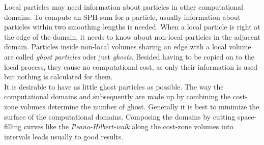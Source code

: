 Local particles may need information about particles in other computational domains. To compute an SPH-sum for a particle, usually information about particles within two smoothing lengths is needed. When a local particle is right at the edge of the domain, it needs to know about non-local particles in the adjacent domain. Particles inside non-local volumes sharing an edge with a local volume are called \emph{ghost particles} oder just \emph{ghosts}. Besided having to be copied on to the local process, they cause no computational cost, as only their information is used but nothing is calculated for them.\\

It is desirable to have as little ghost particles as possible. The way the computational domains and subsequently are made up by combining the cost-zone volumes determine the number of ghost. Generally it is best to minimize the surface of the computational domains. Composing the domains by cutting space-filling curves like the \emph{Peano-Hilbert-walk} along the cost-zone volumes into intervals leads usually to good results.\\

